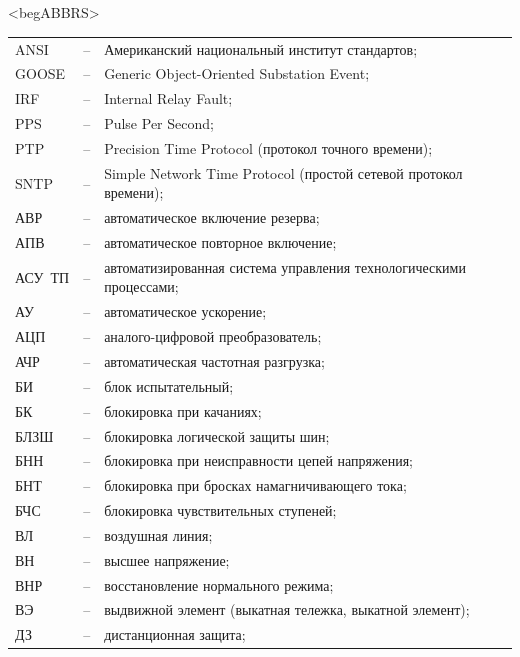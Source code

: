 \color{uniblue}\section*{}
{\color{white}\fontsize{0.1pt}{0.1pt}\selectfont<begABBRS>}
\color{black}
\begin{longtable}{>{\raggedright\arraybackslash}m{2cm}>{\raggedright\arraybackslash}m{0.5cm}>{\raggedright\arraybackslash}m{20cm}}
\endfirsthead\endhead\endfoot\endlastfoot
ANSI & -- & Американский национальный институт стандартов; \\
GOOSE & -- & Generic Object-Oriented Substation Event; \\
IRF & -- & Internal Relay Fault; \\
PPS & -- & Pulse Per Second; \\
PTP & -- & Precision Time Protocol (протокол точного времени); \\
SNTP & -- & Simple Network Time Protocol (простой сетевой протокол времени); \\
АВР & -- & автоматическое включение резерва; \\
АПВ & -- & автоматическое повторное включение; \\
АСУ~ТП & -- & автоматизированная система управления технологическими процессами; \\
АУ & -- & автоматическое ускорение; \\
АЦП & -- & аналого-цифровой преобразователь; \\
АЧР & -- & автоматическая частотная разгрузка; \\
БИ & -- & блок испытательный; \\
БК & -- & блокировка при качаниях; \\
БЛЗШ & -- & блокировка логической защиты шин; \\
БНН & -- & блокировка при неисправности цепей напряжения; \\
БНТ & -- & блокировка при бросках намагничивающего тока; \\
БЧС & -- & блокировка чувствительных ступеней; \\
ВЛ & -- & воздушная линия; \\
ВН & -- & высшее напряжение; \\
ВНР & -- & восстановление нормального режима; \\
ВЭ & -- & выдвижной элемент (выкатная тележка, выкатной элемент); \\
ДЗ & -- & дистанционная защита; \\

\end{longtable}
